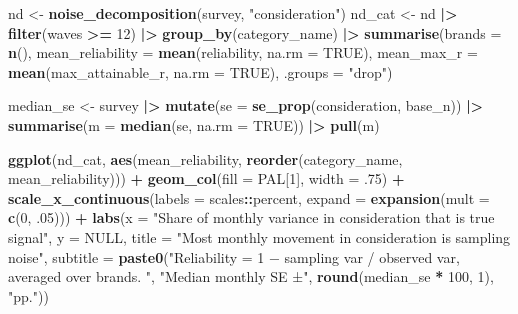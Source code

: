 \documentclass[
]{article}
\newenvironment{Shaded}{\begin{snugshade}}{\end{snugshade}}
\newcommand{\AttributeTok}[1]{\textcolor[rgb]{0.13,0.29,0.53}{#1}}
\newcommand{\ConstantTok}[1]{\textcolor[rgb]{0.56,0.35,0.01}{#1}}
\newcommand{\DecValTok}[1]{\textcolor[rgb]{0.00,0.00,0.81}{#1}}
\newcommand{\FunctionTok}[1]{\textcolor[rgb]{0.13,0.29,0.53}{\textbf{#1}}}
\newcommand{\NormalTok}[1]{#1}
\newcommand{\OtherTok}[1]{\textcolor[rgb]{0.56,0.35,0.01}{#1}}
\newcommand{\SpecialCharTok}[1]{\textcolor[rgb]{0.81,0.36,0.00}{\textbf{#1}}}
\newcommand{\StringTok}[1]{\textcolor[rgb]{0.31,0.60,0.02}{#1}}
\begin{document}
\begin{Shaded}
\begin{Highlighting}[]
\NormalTok{nd }\OtherTok{\textless{}{-}} \FunctionTok{noise\_decomposition}\NormalTok{(survey, }\StringTok{"consideration"}\NormalTok{)}
\NormalTok{nd\_cat }\OtherTok{\textless{}{-}}\NormalTok{ nd }\SpecialCharTok{|\textgreater{}} \FunctionTok{filter}\NormalTok{(waves }\SpecialCharTok{\textgreater{}=} \DecValTok{12}\NormalTok{) }\SpecialCharTok{|\textgreater{}}
  \FunctionTok{group\_by}\NormalTok{(category\_name) }\SpecialCharTok{|\textgreater{}}
  \FunctionTok{summarise}\NormalTok{(}\AttributeTok{brands =} \FunctionTok{n}\NormalTok{(), }\AttributeTok{mean\_reliability =} \FunctionTok{mean}\NormalTok{(reliability, }\AttributeTok{na.rm =} \ConstantTok{TRUE}\NormalTok{),}
            \AttributeTok{mean\_max\_r =} \FunctionTok{mean}\NormalTok{(max\_attainable\_r, }\AttributeTok{na.rm =} \ConstantTok{TRUE}\NormalTok{), }\AttributeTok{.groups =} \StringTok{"drop"}\NormalTok{)}

\NormalTok{median\_se }\OtherTok{\textless{}{-}}\NormalTok{ survey }\SpecialCharTok{|\textgreater{}} \FunctionTok{mutate}\NormalTok{(}\AttributeTok{se =} \FunctionTok{se\_prop}\NormalTok{(consideration, base\_n)) }\SpecialCharTok{|\textgreater{}}
  \FunctionTok{summarise}\NormalTok{(}\AttributeTok{m =} \FunctionTok{median}\NormalTok{(se, }\AttributeTok{na.rm =} \ConstantTok{TRUE}\NormalTok{)) }\SpecialCharTok{|\textgreater{}} \FunctionTok{pull}\NormalTok{(m)}

\FunctionTok{ggplot}\NormalTok{(nd\_cat, }\FunctionTok{aes}\NormalTok{(mean\_reliability, }\FunctionTok{reorder}\NormalTok{(category\_name, mean\_reliability))) }\SpecialCharTok{+}
  \FunctionTok{geom\_col}\NormalTok{(}\AttributeTok{fill =}\NormalTok{ PAL[}\DecValTok{1}\NormalTok{], }\AttributeTok{width =}\NormalTok{ .}\DecValTok{75}\NormalTok{) }\SpecialCharTok{+}
  \FunctionTok{scale\_x\_continuous}\NormalTok{(}\AttributeTok{labels =}\NormalTok{ scales}\SpecialCharTok{::}\NormalTok{percent, }\AttributeTok{expand =} \FunctionTok{expansion}\NormalTok{(}\AttributeTok{mult =} \FunctionTok{c}\NormalTok{(}\DecValTok{0}\NormalTok{, .}\DecValTok{05}\NormalTok{))) }\SpecialCharTok{+}
  \FunctionTok{labs}\NormalTok{(}\AttributeTok{x =} \StringTok{"Share of monthly variance in consideration that is true signal"}\NormalTok{,}
       \AttributeTok{y =} \ConstantTok{NULL}\NormalTok{,}
       \AttributeTok{title =} \StringTok{"Most monthly movement in consideration is sampling noise"}\NormalTok{,}
       \AttributeTok{subtitle =} \FunctionTok{paste0}\NormalTok{(}\StringTok{"Reliability = 1 − sampling var / observed var, averaged over brands. "}\NormalTok{,}
                         \StringTok{"Median monthly SE ±"}\NormalTok{, }\FunctionTok{round}\NormalTok{(median\_se }\SpecialCharTok{*} \DecValTok{100}\NormalTok{, }\DecValTok{1}\NormalTok{), }\StringTok{"pp."}\NormalTok{))}
\end{Highlighting}
\end{Shaded}
\end{document}
